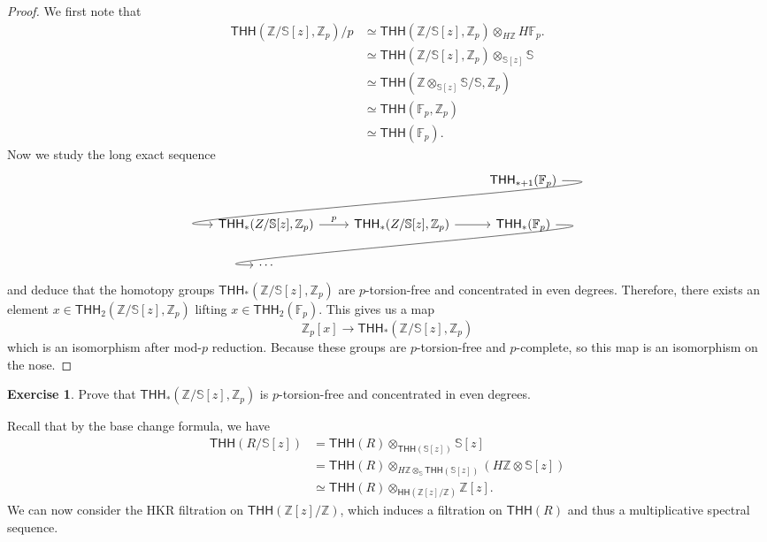 \documentclass[10pt, oneside]{memoir}
\theoremstyle{definition}
\newtheorem{exer}[thm]{Exercise}
\theoremstyle{remark}
\theoremstyle{plain}
\theoremstyle{definition}
\theoremstyle{remark}
\newcommand{\Z}{\mathbb{Z}}
\newcommand{\F}{\mathbb{F}}
\newcommand{\bS}{\mathbb{S}}
\newcommand{\ms}[1]{\mathsf{#1}}
\newcommand{\1}{\mathbf{1}}
\newcommand{\2}{\mathbf{2}}
\newcommand{\3}{\mathbf{3}}
\newcommand{\THH}{\ms{THH}}
\newcommand{\HH}{\ms{HH}}
\begin{document}
\begin{proof}
    We first note that
    \begin{align*}
        \THH(\Z/\bS[z], \Z_p) / p &\simeq \THH(\Z/\bS[z], \Z_p) \otimes_{H \Z} H \F_p. \\
        &\simeq \THH(\Z/\bS[z], \Z_p) \otimes_{\bS[z]} \bS \\
        &\simeq \THH(\Z \otimes_{\bS[z]} \bS / \bS, \Z_p) \\
        &\simeq \THH(\F_p, \Z_p) \\
        &\simeq \THH(\F_p).
    \end{align*}
    Now we study the long exact sequence
    \begin{equation*}
        \begin{tikzcd}
            & & \THH_{*+1}(\F_p) \arrow[out=0, in=180, looseness=1]{dll} \\
            \THH_*(Z/\bS[z], \Z_p) \ar{r}{p} & \THH_*(Z/\bS[z], \Z_p) \ar{r} & \THH_*(\F_p) \arrow[out=0,in=180, looseness=1]{dll} \\
            \cdots
        \end{tikzcd}
    \end{equation*}
    and deduce that the homotopy groups \(\THH_*(\Z/\bS[z], \Z_p) \) are \(p \)-torsion-free and concentrated in even degrees. Therefore, there exists an element \(x \in \THH_2(\Z/\bS[z], \Z_p) \) lifting \(x \in \THH_2(\F_p) \). This gives us a map
    \[ \Z_p [ x] \to \THH_* (\Z/\bS[z], \Z_p) \]
    which is an isomorphism after mod-\(p \) reduction. Because these groups are \(p \)-torsion-free and \(p \)-complete, so this map is an isomorphism on the nose.
\end{proof}

\begin{exer}
    Prove that \(\THH_*(\Z/\bS[z], \Z_p) \) is \(p \)-torsion-free and concentrated in even degrees.
\end{exer}

Recall that by the base change formula, we have
\begin{align*}
    \THH(R/\bS[z]) &= \THH(R) \otimes_{\THH(\bS[z])} \bS [z] \\
    &= \THH(R) \otimes_{H\Z \otimes_{\bS} \THH(\bS[z])} (H \Z \otimes \bS[z]) \\
    &\simeq \THH(R) \otimes_{\HH(\Z[z]/\Z)} \Z[z].
\end{align*}
We can now consider the HKR filtration on \(\THH(\Z[z]/\Z) \), which induces a filtration on \(\THH(R) \) and thus a multiplicative spectral sequence.
\end{document}
